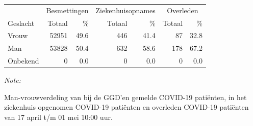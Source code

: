 \documentclass[
  english,
  man,floatsintext]{apa6}
\begin{document}
\begin{table}
\centering\begingroup\fontsize{11}{13}\selectfont

\begin{threeparttable}
\begin{tabular}{lrrrrrr}
\toprule
\multicolumn{1}{c}{ } & \multicolumn{2}{c}{Besmettingen} & \multicolumn{2}{c}{Ziekenhuisopnames} & \multicolumn{2}{c}{Overleden} \\
\cmidrule(l{3pt}r{3pt}){2-3} \cmidrule(l{3pt}r{3pt}){4-5} \cmidrule(l{3pt}r{3pt}){6-7}
Geslacht & Totaal & \% & Totaal & \% & Totaal & \%\\
\midrule
Vrouw & 52951 & 49.6 & 446 & 41.4 & 87 & 32.8\\
Man & 53828 & 50.4 & 632 & 58.6 & 178 & 67.2\\
Onbekend & 0 & 0.0 & 0 & 0.0 & 0 & 0.0\\
\bottomrule
\end{tabular}
\begin{tablenotes}
\item \textit{Note: } 
\item Man-vrouwverdeling van bij de GGD’en gemelde COVID-19 patiënten, in het ziekenhuis opgenomen COVID-19 patiënten en overleden COVID-19 patiënten van 17 april t/m 01 mei 10:00 uur.
\end{tablenotes}
\end{threeparttable}
\endgroup{}
\end{table}
\newpage
\end{document}
